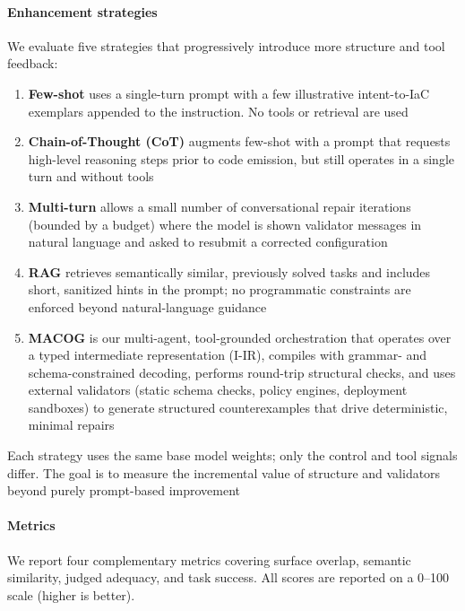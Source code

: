 \documentclass[manuscript,screen,nonacm]{acmart}
\begin{document}
\paragraph{Enhancement strategies}
We evaluate five strategies that progressively introduce more structure and tool feedback:
\begin{enumerate}
  \item \textbf{Few-shot} uses a single-turn prompt with a few illustrative intent-to-IaC exemplars appended to the instruction. No tools or retrieval are used
  \item \textbf{Chain-of-Thought (CoT)} augments few-shot with a prompt that requests high-level reasoning steps prior to code emission, but still operates in a single turn and without tools
  \item \textbf{Multi-turn} allows a small number of conversational repair iterations (bounded by a budget) where the model is shown validator messages in natural language and asked to resubmit a corrected configuration
  \item \textbf{RAG} retrieves semantically similar, previously solved tasks and includes short, sanitized hints in the prompt; no programmatic constraints are enforced beyond natural-language guidance
  \item \textbf{MACOG} is our multi-agent, tool-grounded orchestration that operates over a typed intermediate representation (I-IR), compiles with grammar- and schema-constrained decoding, performs round-trip structural checks, and uses external validators (static schema checks, policy engines, deployment sandboxes) to generate structured counterexamples that drive deterministic, minimal repairs
\end{enumerate}
Each strategy uses the same base model weights; only the control and tool signals differ. The goal is to measure the incremental value of structure and validators beyond purely prompt-based improvement


\paragraph{Metrics}
We report four complementary metrics covering surface overlap, semantic similarity, judged adequacy, and task success. All scores are reported on a 0–100 scale (higher is better).
\end{document}
